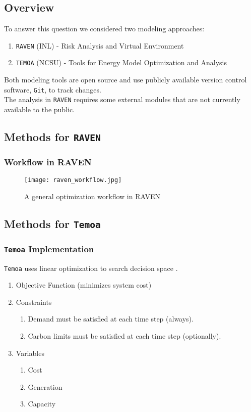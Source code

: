 \subsection{Overview}
\begin{frame}
    To answer this question we considered two modeling approaches:
    \begin{enumerate}
      \item \texttt{RAVEN} (INL) - Risk Analysis and Virtual Environment \cite{baker_optimal_2018}\cite{epiney_report_2017}
      \item \texttt{TEMOA} (NCSU) - Tools for Energy Model Optimization and Analysis \cite{decarolis_modelling_2016}\cite{decarolis_temoa_2010}\cite{hunter_modeling_2013}
    \end{enumerate}
    \vspace{0.5cm}
    Both modeling tools are open source and use publicly available version control
    software, \texttt{Git}, to track changes. \\

    The analysis in \texttt{RAVEN} requires some external modules that are not currently
    available to the public.
\end{frame}

\subsection{Methods for \texttt{RAVEN}}
\begin{frame}
  \frametitle{Workflow in RAVEN}
  \begin{figure}
    \texttt{[image: raven\_workflow.jpg]}
    \caption{A general optimization workflow in RAVEN}
    \label{fig:workflow}
  \end{figure}
\end{frame}

\subsection{Methods for \texttt{Temoa}}
\begin{frame}
  \frametitle{\texttt{Temoa} Implementation}
  \texttt{Temoa} uses linear optimization to search decision space \cite{hunter_modeling_2013}.
  \begin{enumerate}
    \item Objective Function (minimizes system cost)
    \item Constraints
    \begin{enumerate}
      \item Demand must be satisfied at each time step (always).
      \item Carbon limits must be satisfied at each time step (optionally).
    \end{enumerate}
    \item Variables
    \begin{enumerate}
      \item Cost
      \item Generation
      \item Capacity
    \end{enumerate}
  \end{enumerate}
\end{frame}

